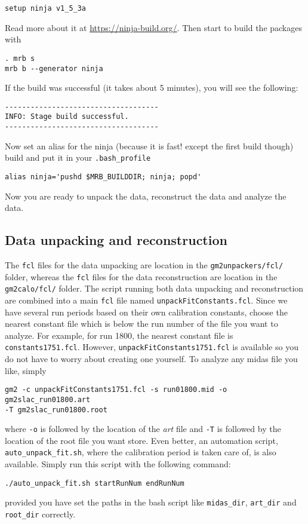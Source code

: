 %
\begin{Verbatim}[frame=single]
setup ninja v1_5_3a
\end{Verbatim}
%
Read more about it at \url{https://ninja-build.org/}.
Then start to build the packages with
%
\begin{Verbatim}[frame=single]
. mrb s
mrb b --generator ninja
\end{Verbatim}
%
If the build was successful (it takes about 5 minutes), you will see the following:
%
\begin{Verbatim}[frame=single]
------------------------------------
INFO: Stage build successful.
------------------------------------
\end{Verbatim}
%
Now set an alias for the ninja (because it is fast! except the first build though) build and put it in your \verb+.bash_profile+
%
\begin{Verbatim}[frame=single]
alias ninja='pushd $MRB_BUILDDIR; ninja; popd'
\end{Verbatim}
%
Now you are ready to unpack the data, reconstruct the data and analyze the data.

\subsection{Data unpacking and reconstruction}

The \verb+fcl+ files for the data unpacking are location in the \verb+gm2unpackers/fcl/+ folder,
whereas the \verb+fcl+ files for the data reconstruction are location in the \verb+gm2calo/fcl/+ folder.
The script running both data unpacking and reconstruction are combined into a main \verb+fcl+ file named \verb+unpackFitConstants.fcl+.
Since we have several run periods based on their own calibration constants,
choose the nearest constant file which is below the run number of the file you want to analyze. For example, for run 1800, the nearest
constant file is \verb+constants1751.fcl+. However, \verb+unpackFitConstants1751.fcl+ is available so you do not have to worry about creating one yourself.
To analyze any midas file you like, simply
%
\begin{Verbatim}[frame=single]
gm2 -c unpackFitConstants1751.fcl -s run01800.mid -o gm2slac_run01800.art
-T gm2slac_run01800.root
\end{Verbatim}
%
where \verb+-o+ is followed by the location of the \textit{art} file and \verb+-T+ is followed by the location of the root file you want store.
Even better, an automation script, \verb+auto_unpack_fit.sh+, where the calibration period is taken care of, is also available. Simply run this script with the
following command:
%
\begin{Verbatim}[frame=single]
./auto_unpack_fit.sh startRunNum endRunNum
\end{Verbatim}
%
provided you have set the paths in the bash script like \verb+midas_dir+, \verb+art_dir+ and \verb+root_dir+ correctly.
